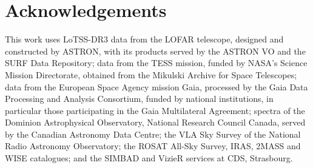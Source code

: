 \documentclass[3p,11pt]{elsarticle}
\begin{document}
\section*{Acknowledgements}

This work uses LoTSS-DR3 data from the LOFAR telescope, designed and constructed by
ASTRON, with its products served by the ASTRON VO and the SURF Data Repository; data
from the TESS mission, funded by NASA's Science Mission Directorate, obtained from the
Mikulski Archive for Space Telescopes; data from the European Space Agency mission
Gaia, processed by the Gaia Data Processing and Analysis Consortium, funded by national
institutions, in particular those participating in the Gaia Multilateral Agreement;
spectra of the Dominion Astrophysical Observatory, National Research Council Canada,
served by the Canadian Astronomy Data Centre; the VLA Sky Survey of the National Radio
Astronomy Observatory; the ROSAT All-Sky Survey, IRAS, 2MASS and WISE catalogues; and the
SIMBAD and VizieR services at CDS, Strasbourg.
\end{document}
